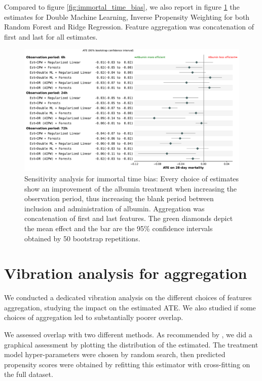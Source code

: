 \documentclass[french,12pt,twoside,a4paper]{book}
\begin{document}
\begin{appendices}
  Compared to figure \ref{fig:immortal_time_bias}, we also report in figure
  \ref{apd:fig:detailed_results_itb} the estimates for Double Machine Learning,
  Inverse Propensity Weighting for both Random Forest and Ridge Regression.
  Feature aggregation was concatenation of first and last for all estimates.

  \begin{figure}[h!]
    \centering
    \includegraphics[width=\linewidth]{img/chapter_4/itb__immortal_time_bias_double_robust_forest_agg_first_last__bs_30_supp.pdf}
    \caption{Sensitivity analysis for immortal time bias: Every choice of
      estimates show an improvement of the albumin treatment when increasing the
      observation period, thus increasing the blank period between inclusion and
      administration of albumin. Aggregation was concatenation of first and last
      features. The green diamonds depict the mean effect and the bar are the
      95\% confidence intervals obtained by 50 bootstrap
      repetitions.}\label{apd:fig:detailed_results_itb}
  \end{figure}


  \section{Vibration analysis for aggregation}\label{apd:vibration_analysis_for_aggregation}

  We conducted a dedicated vibration analysis on the different choices of features aggregation, studying the impact on the estimated ATE. We also studied if some choices of aggregation led to substantially poorer overlap.

  We assessed overlap with two different methods. As recommended by
  \citep{austin2015moving}, we did a graphical assessment by plotting the
  distribution of the estimated. The treatment model hyper-parameters were chosen
  by random search, then predicted propensity scores were obtained by refitting
  this estimator with cross-fitting on the full dataset.


\end{appendices}
\end{document}
